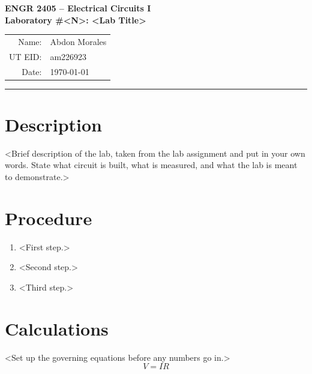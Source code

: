 \documentclass[11pt]{article}
\begin{document}
\begin{center}
    {\large\bfseries ENGR 2405 -- Electrical Circuits I}\\[2pt]
    {\large\bfseries Laboratory \#<N>: <Lab Title>}\\[10pt]
    \begin{tabular}{rl}
        Name:    & Abdon Morales \\
        UT EID:  & am226923 \\
        Date:    & \today \\
    \end{tabular}
\end{center}
\vspace{0.5em}
\hrule
\vspace{1.5em}

\section*{Description}
<Brief description of the lab, taken from the lab assignment and put in your own
words. State what circuit is built, what is measured, and what the lab is meant
to demonstrate.>

\section*{Procedure}
\begin{enumerate}[leftmargin=*]
    \item <First step.>
    \item <Second step.>
    \item <Third step.>
\end{enumerate}

\section*{Calculations}
<Set up the governing equations before any numbers go in.>
\[
    V = IR
\]

% 
\end{document}
